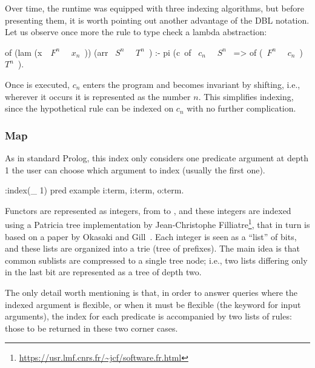 \documentclass[a4paper, 11pt]{book}
\begin{document}
Over time, the runtime was equipped with three indexing algorithms, but before
presenting them, it is worth pointing out another advantage of the DBL
notation. Let us observe once more the rule to type check a lambda abstraction:

\begin{elpicode}
of (lam (x\ ~$F^n$~ ~$x_n$~)) (arr ~$S^n$~ ~$T^n$~) :-
  pi (c\ of ~$c_n$~ ~$S^n$~ => of (~$F^n$~ ~$c_n$~) ~$T^n$~).
\end{elpicode}

\noindent

Once  is executed, $c_n$ enters the program and becomes invariant by
shifting, i.e., wherever it occurs it is represented as the number $n$. This
simplifies indexing, since the hypothetical rule 
can be indexed on $c_n$ with no further complication.

\subsubsection{Map}


As in standard Prolog, this index only considers one predicate argument at
depth 1 the user can choose which argument to index (usually the first one).

\begin{elpicode}
:index(_ 1) %
pred example i:term, i:term, o:term.
\end{elpicode}

\noindent

Functors are represented as integers, from  to , and
these integers are indexed using a Patricia tree implementation by
Jean-Christophe Filliatre\footnote{\url{https://usr.lmf.cnrs.fr/~jcf/software.fr.html}},
that in turn is based on a paper by Okasaki and Gill~\cite{Okasaki:98:IntMap}.
Each integer is
seen as a ``list'' of bits, and these lists are organized into a trie (tree of
prefixes). The main idea is that common sublists are compressed to a single
tree node; i.e., two lists differing only in the last bit are represented as a
tree of depth two.


The only detail worth mentioning is that, in order to answer queries where the
indexed argument is flexible, or when it must be flexible (the 
keyword for input arguments), the index for each predicate is accompanied by
two lists of rules: those to be returned in these two corner cases.
\end{document}
